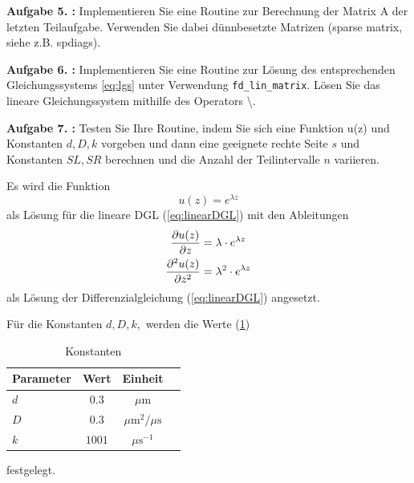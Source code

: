 \begin{mybox}
	\textbf{Aufgabe 5. :} Implementieren Sie eine Routine zur Berechnung
	der Matrix A der letzten Teilaufgabe. Verwenden
	Sie dabei dünnbesetzte Matrizen (sparse matrix, siehe z.B. spdiags).
\end{mybox}



\begin{mybox}
	\textbf{Aufgabe 6. :}
	Implementieren Sie eine Routine zur Lösung des entsprechenden
	Gleichungssystems \cref{eq:lgs} unter Verwendung
	\verb*|fd_lin_matrix|. Lösen Sie das lineare Gleichungssystem mithilfe des
	Operators \textbackslash .
\end{mybox}



\begin{mybox}
	\textbf{Aufgabe 7. :} Testen Sie Ihre Routine, indem Sie sich eine
	Funktion u(z) und Konstanten $d, D, k$ vorgeben und
	dann eine geeignete rechte Seite $s$ und Konstanten $SL, SR$ berechnen
	und die Anzahl der Teilintervalle
	$n$ variieren.
\end{mybox}
Es wird die Funktion
\begin{equation}\label{eq:ladungstraegerdichte}
	u(z)=e^{\lambda z}
\end{equation}
als Lösung für die lineare DGL (\cref{eq:linearDGL}) mit den Ableitungen
\begin{align}\label{eq:fundamental_ableitung}
	\pdv{u(z)}{z}    & =\lambda \cdot e^{\lambda z}   \\
	\pdv[2]{u(z)}{z} & =\lambda^2 \cdot e^{\lambda z}
\end{align}
als Lösung der Differenzialgleichung (\cref{eq:linearDGL}) angesetzt.

Für die Konstanten  $d, D, k,$ werden die Werte (\cref{t:const})
\begin{table}
	\centering
	\caption{Konstanten}
	\label{t:const}
	\begin{tabular}{lccc}
		\toprule

		Parameter      & Wert   & Einheit                        \\
		\midrule
		$d$            & $0.3$  & $\si{\mu\meter}$               \\

		$D$            & $0.3$  & $\si{\mu\square\m\per \mu \s}$ \\

		$k$            & $1001$ & $\si{\mu\second^{-1}}$         \\

		\bottomrule

	\end{tabular}
\end{table}
festgelegt.

